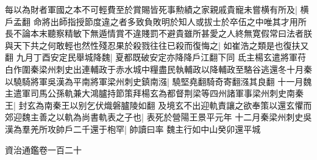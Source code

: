 每以為財者軍國之本不可輕費至於賞賜皆死事勲績之家親戚貴寵未嘗横有所及|{
	横戶孟翻}
命將出師指授節度違之者多致負敗明於知人或拔士於卒伍之中唯其才用所長不論本末聽察精敏下無遁情賞不違賤罰不避貴雖所甚愛之人終無寛假常曰法者朕與天下共之何敢輕也然性殘忍果於殺戮往往已殺而復悔之|{
	如崔浩之類是也復扶又翻}
九月丁酉安定民舉城降魏|{
	夏都既破安定亦降降戶江翻下同}
氐主楊玄遣將軍苻白作圍秦梁州刺史出連輔政于赤水城中糧盡民執輔政以降輔政至駱谷逃還冬十月秦以驍騎將軍吳漢為平南將軍梁州刺史鎮南漒|{
	驍堅堯翻騎奇寄翻漒其良翻}
十一月魏主遣軍司馬公孫軌兼大鴻臚持節策拜楊玄為都督荆梁等四州諸軍事梁州刺史南秦王|{
	封玄為南秦王以别乞伏熾磐臚陵如翻}
及境玄不出迎軌責讓之欲奉策以還玄懼而郊迎魏主善之以軌為尚書軌表之子也|{
	表死於營陽王景平元年}
十二月秦梁州刺史吳漢為羣羌所攻帥戶二千還于枹罕|{
	帥讀曰率}
魏主行如中山癸卯還平城

資治通鑑卷一百二十
